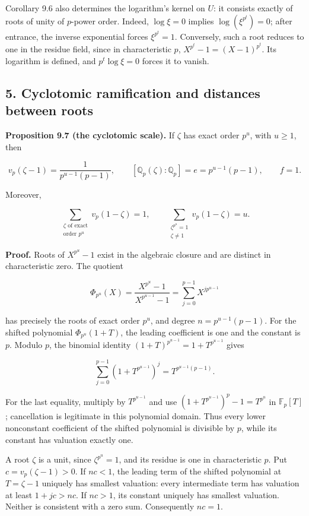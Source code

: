 \documentclass[
  11pt,
  a4paper,
]{article}
\begin{document}
Corollary 9.6 also determines the logarithm's kernel on \(U\): it
consists exactly of roots of unity of \(p\)-power order. Indeed,
\(\log\xi=0\) implies \(\log(\xi^{p^t})=0\); after entrance, the inverse
exponential forces \(\xi^{p^t}=1\). Conversely, such a root reduces to
one in the residue field, since in characteristic \(p\),
\(X^{p^t}-1=(X-1)^{p^t}\). Its logarithm is defined, and
\(p^t\log\xi=0\) forces it to vanish.

\subsection{5. Cyclotomic ramification and distances between
roots}\label{cyclotomic-ramification-and-distances-between-roots}

\textbf{Proposition 9.7 (the cyclotomic scale).} If \(\zeta\) has exact
order \(p^u\), with \(u\ge1\), then

\[
v_p(\zeta-1)=\frac1{p^{u-1}(p-1)},
\qquad
[\mathbb Q_p(\zeta):\mathbb Q_p]=e=p^{u-1}(p-1),
\qquad f=1.
\tag{9.11}
\]

Moreover,

\[
\sum_{\substack{\zeta\text{ of exact}\\\text{order }p^u}}v_p(1-\zeta)=1,
\qquad
\sum_{\substack{\zeta^{p^u}=1\\\zeta\ne1}}v_p(1-\zeta)=u.
\tag{9.12}
\]

\textbf{Proof.} Roots of \(X^{p^u}-1\) exist in the algebraic closure
and are distinct in characteristic zero. The quotient

\[
\Phi_{p^u}(X)=\frac{X^{p^u}-1}{X^{p^{u-1}}-1}
=\sum_{j=0}^{p-1}X^{jp^{u-1}}
\]

has precisely the roots of exact order \(p^u\), and degree
\(n=p^{u-1}(p-1)\). For the shifted polynomial \(\Phi_{p^u}(1+T)\), the
leading coefficient is one and the constant is \(p\). Modulo \(p\), the
binomial identity \((1+T)^{p^{u-1}}=1+T^{p^{u-1}}\) gives

\[
\sum_{j=0}^{p-1}(1+T^{p^{u-1}})^j
=T^{p^{u-1}(p-1)}.
\]

For the last equality, multiply by \(T^{p^{u-1}}\) and use
\((1+T^{p^{u-1}})^p-1=T^{p^u}\) in \(\mathbb F_p[T]\); cancellation is
legitimate in this polynomial domain. Thus every lower nonconstant
coefficient of the shifted polynomial is divisible by \(p\), while its
constant has valuation exactly one.

A root \(\zeta\) is a unit, since \(\zeta^{p^u}=1\), and its residue is
one in characteristic \(p\). Put \(c=v_p(\zeta-1)>0\). If \(nc<1\), the
leading term of the shifted polynomial at \(T=\zeta-1\) uniquely has
smallest valuation: every intermediate term has valuation at least
\(1+jc>nc\). If \(nc>1\), its constant uniquely has smallest valuation.
Neither is consistent with a zero sum. Consequently \(nc=1\).
\end{document}
